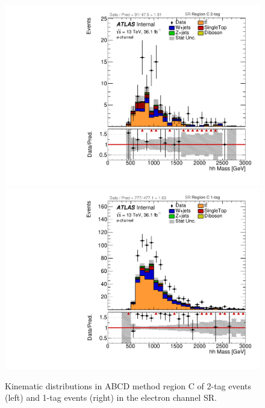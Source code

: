 \begin{figure}[!htbp]
\begin{center}
\includegraphics[scale=0.23]{./figures/boosted/ABCD/elec_SR_RegionC_hhMass}
\includegraphics[scale=0.23]{./figures/boosted/ABCD/elec_SR_RegionC_1tag_hhMass}
\caption{Kinematic distributions in ABCD method region C of 2-tag events (left) and 1-tag events (right) in the electron channel SR.}
\label{fig:boosted_abcd_region_c_SR_elec}
\end{center}
\end{figure}

